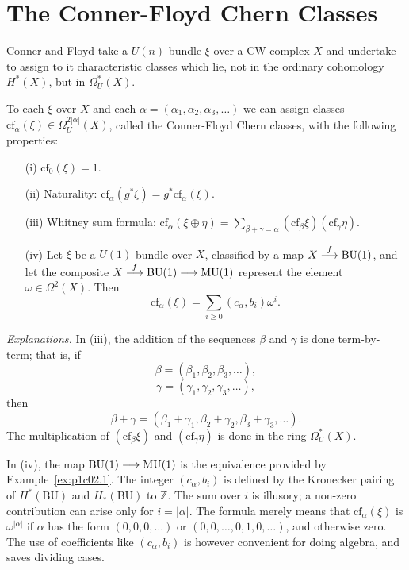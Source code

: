 \documentclass[../main]{subfiles}
\begin{document}
\label{sec:p1c4}

\chapter{The Conner-Floyd Chern Classes}

Conner and Floyd take a $U(n)$-bundle $\xi$ over a CW-complex $X$ and undertake to assign to it characteristic classes which lie, not in the ordinary cohomology $H^\ast(X)$, but in $\Omega_U^\ast(X)$.

\begin{theorem}
\label{thm:p1ch04.1}
To each $\xi$ over $X$ and each $\alpha = (\alpha_1, \alpha_2, \alpha_3, \ldots)$ we can assign classes $\mathrm{cf}_\alpha(\xi) \in \Omega_U^{2 |\alpha|}(X)$, called the Conner-Floyd Chern classes, with the following properties: 

\begin{enumerate}
\item[(i)] $\mathrm{cf}_0(\xi) = 1$.
\item[(ii)] Naturality: $\mathrm{cf}_\alpha(g^\ast \xi) = g^\ast \mathrm{cf}_\alpha (\xi)$.
\item[(iii)] Whitney sum formula: $\displaystyle \mathrm{cf}_\alpha(\xi \oplus \eta) = \sum_{\beta + \gamma = \alpha} (\mathrm{cf}_\beta \xi) (\mathrm{cf}_\gamma \eta).$
\item[(iv)] Let $\xi$ be a $U(1)$-bundle over $X$, classified by a map $X \overset{f}{\longrightarrow} \mathrm{BU}(1)$, and let the composite $X \overset{f}{\longrightarrow} \mathrm{BU}(1) \overset{}{\longrightarrow} \mathrm{MU}(1)$ represent the element $\omega \in \Omega^2(X)$. Then $$\mathrm{cf}_\alpha(\xi) = \sum_{i \ge 0} (c_\alpha, b_i) \omega^i.$$
\end{enumerate}
\end{theorem} 

\emph{Explanations.} In (iii), the addition of the sequences $\beta$ and $\gamma$ is done term-by-term; that is, if $$\beta = (\beta_1, \beta_2, \beta_3, \ldots),$$ $$\gamma = (\gamma_1, \gamma_2, \gamma_3, \ldots),$$ then $$\beta + \gamma = (\beta_1 + \gamma_1, \beta_2 + \gamma_2, \beta_3 + \gamma_3, \ldots).$$ The multiplication of $(\mathrm{cf}_\beta \xi)$ and $(\mathrm {cf}_\gamma \eta)$ is done in the ring $\Omega_U^\ast(X)$.

In (iv), the map $\mathrm{BU}(1) \overset{}{\longrightarrow} \mathrm{MU}(1)$ is the equivalence provided by Example~\ref{ex:p1c02.1}. The integer $(c_\alpha, b_i)$ is defined by the Kronecker pairing of $H^\ast(\mathrm{BU})$ and $H_\ast(\mathrm{BU})$ to $\mathbb Z$. The sum over $i$ is illusory; a non-zero contribution can arise only for $i = |\alpha|$. The formula merely means that $\mathrm{cf}_\alpha(\xi)$ is $\omega^{|\alpha|}$ if $\alpha$ has the form $(0, 0, 0, \ldots)$ or $(0, 0, \ldots, 0, 1, 0, \ldots)$, and otherwise zero. The use of coefficients like $(c_\alpha, b_i)$ is however convenient for doing algebra, and saves dividing cases.
\end{document}
